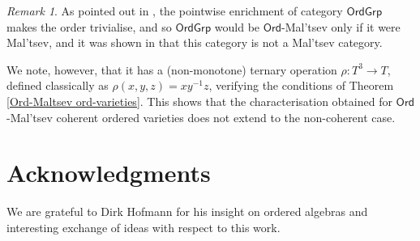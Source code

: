 \documentclass[11pt]{amsart}
\theoremstyle{plain}
\theoremstyle{definition}
\theoremstyle{remark}
\newtheorem{remark}[subsection]{Remark}
\newcommand{\Grp}{\ensuremath{\mathsf{Grp}}}
\newcommand{\Ord}{\ensuremath{\mathsf{Ord}}}
\begin{document}
\begin{remark}
As pointed out in \cite[Example 6.4]{CR}, the pointwise enrichment of category $\Ord\Grp$ makes the order trivialise, and so $\Ord\Grp$ would be $\Ord$-Mal'tsev only if it were Mal'tsev, and it was shown in \cite[Theorem 4.6]{CM-FM} that this category is not a Mal'tsev category.

We note, however, that it has a (non-monotone) ternary operation $\rho\colon T^3\to T$, defined classically as $\rho(x,y,z)=xy^{-1}z$, verifying the conditions of Theorem \ref{Ord-Maltsev ord-varieties}. This shows that the characterisation obtained for \Ord-Mal'tsev coherent ordered varieties does not extend to the non-coherent case.
\end{remark}

\section*{Acknowledgments}
We are grateful to Dirk Hofmann for his insight on ordered algebras and interesting exchange of ideas with respect to this work.
\end{document}
